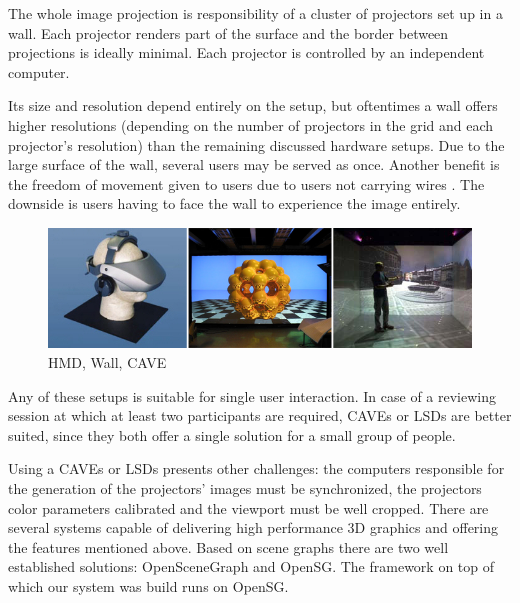 \begin{description}
	  The whole image projection is responsibility of a cluster of projectors set up in a wall.
	  Each projector renders part of the surface and the border between projections is ideally minimal.
	  Each projector is controlled by an independent computer.
	  
		Its size and resolution depend entirely on the setup, but oftentimes a wall offers higher resolutions
		(depending on the number of projectors in the grid and each projector's resolution)
		than the remaining discussed hardware setups.
		Due to the large surface of the wall, several users may be served as once.
		Another benefit is the freedom of movement given to users due to users not carrying wires \cite{INTTABLE}.
		The downside is users having to face the wall to experience the image entirely.
\end{description}

\begin{figure}[!ht]
	\centering
	\includegraphics[width=12cm]{gfx/hmd-cluster-cave.png}
	\caption{HMD, Wall, CAVE}
	\label{FIG-HMD-CLUSTER-CAVE}
\end{figure}

Any of these setups is suitable for single user interaction.
In case of a reviewing session at which at least two participants are required,
CAVEs or LSDs are better suited, since they both offer a single solution for a small group of people.

Using a CAVEs or LSDs presents other challenges:
the computers responsible for the generation of the projectors' images must be synchronized,
the projectors color parameters calibrated and the viewport must be well cropped.
There are several systems capable of delivering high performance 3D graphics and
offering the features mentioned above.
Based on scene graphs there are two well established solutions:
OpenSceneGraph\cite{SITE-OSG} and OpenSG\cite{SITE-OPENSG}.
The framework on top of which our system was build runs on OpenSG.